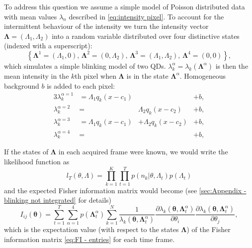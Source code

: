 To address this question we assume a simple model of Poisson distributed data with mean values $\lambda_n$ described in \autoref{eq:intensity pixel}. To account for the intermittent behaviour of the intensity we turn the intensity vector $\bm{\Lambda}=(\Lambda_1,\Lambda_2)$ into a random variable distributed over four distinctive states (indexed with a superscript):
%
\begin{equation*}
	\left\{ \bm{\Lambda}^1=(\Lambda_1,0),\,\bm{\Lambda}^2=(0,\Lambda_2),\,\bm{\Lambda}^3=(\Lambda_1,\Lambda_2),\,\bm{\Lambda}^4=(0,0)\right\},
\end{equation*}
%
which simulates a simple blinking model of two QDs. $\lambda_k^\alpha=\lambda_k(\bm{\Lambda}^\alpha)$ is then the mean intensity in the $k$th pixel when $\bm{\Lambda}$ is in the state $\bm{\Lambda}^\alpha$. Homogeneous background $b$ is added to each pixel:
%
\begin{alignat}{3}
	\lambda_k^{\alpha=1}&=\Lambda_1q_k(x-c_1) & &+b,\nonumber\\ 
	\lambda_k^{\alpha=2}&=&\Lambda_2q_k(x-c_2) &+b,\nonumber\\ 
	\lambda_k^{\alpha=3}&=\Lambda_1q_k(x-c_1)&+\Lambda_2q_k(x-c_2)&+b,\nonumber\\ 
	\lambda_k^{\alpha=4}&=& &+b,
	\label{eq:lambda states}
\end{alignat}

If the states of $\bm{\Lambda}$ in each acquired frame were known, we would write the likelihood function as 
%
\begin{equation}
	l_T(\theta,\Lambda)=\prod_{k=1}^K\prod_{t=1}^Tp(n_k|\theta,\Lambda_t)p(\Lambda_t)
\end{equation}
%
and the expected Fisher information matrix would become (see \autoref{sec:Appendix - blinking not integrated} for details)
%
\begin{equation}
	I_{ij}(\bm{\theta})=\sum_{t=1}^T\sum_{\alpha=1}^4p(\bm{\Lambda}^\alpha_t)\sum_{k=1}^N\frac{1}{\lambda_k(\bm{\theta},\bm{\Lambda}^\alpha_t)}\frac{\partial\lambda_k(\bm{\theta},\bm{\Lambda}^\alpha_t)}{\partial\theta_i}\frac{\partial\lambda_k(\bm{\theta},\bm{\Lambda}^\alpha_t)}{\partial\theta_j},
	\label{eq:Fisher Information Blinking Cheating}
\end{equation}
%
which is the expectation value (with respect to the states $\bm{\Lambda}$) of the Fisher information matrix \autoref{eq:FI - entries} for each time frame. 

